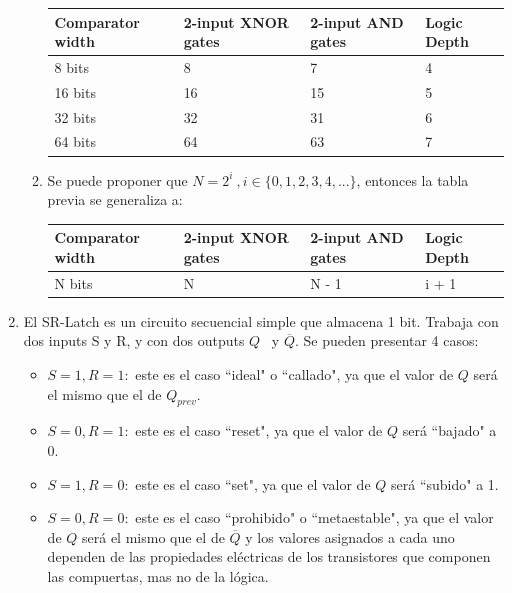 \documentclass[11pt,a4paper]{article}
\begin{document}
\begin{enumerate}
\begin{enumerate}[label=(\alph*)]
\begin{table}[h!]
\centering
\begin{tabular}{|l|l|l|l|}
\hline
Comparator width &2-input XNOR gates &2-input AND gates&Logic Depth\\
\hline
8 bits&8&7&4\\
\hline
16 bits&16&15&5\\
\hline
32 bits&32&31&6\\
\hline
64 bits&64&63&7\\
\hline
\end{tabular}
\end{table}

\item Se puede proponer que $N = 2^i \ , i\in \{0,1,2,3,4,...\}$, entonces la tabla previa se generaliza a:
\begin{table}[h!]
\centering
\begin{tabular}{|l|l|l|l|}
\hline
Comparator width &2-input XNOR gates &2-input AND gates&Logic Depth\\
\hline
N bits&N&N - 1& i + 1\\
\hline
\end{tabular}
\end{table}
\end{enumerate}

\item El SR-Latch es un circuito secuencial simple que almacena 1 bit. Trabaja con dos inputs S y R, y con  dos outputs $Q $ \ y $\overline{Q}$. Se pueden presentar 4 casos:
\begin{itemize}
\item $S = 1, R = 1:$ este es el caso ``ideal" o ``callado", ya que el valor de $Q$ será el mismo que el de $Q_{prev}$.
\item $S = 0, R = 1:$ este es el caso ``reset", ya que el valor de $Q$ será ``bajado" a 0.
\item $S = 1, R = 0:$ este es el caso ``set", ya que el valor de $Q$ será ``subido" a 1.
\item $S = 0, R = 0:$ este es el caso ``prohibido" o ``metaestable", ya que el valor de $Q$ será el mismo que el de $\overline{Q}$ y los valores asignados a cada uno dependen de las propiedades eléctricas de los transistores que componen las compuertas, mas no de la lógica.


\end{itemize}
\end{enumerate}
\end{document}
